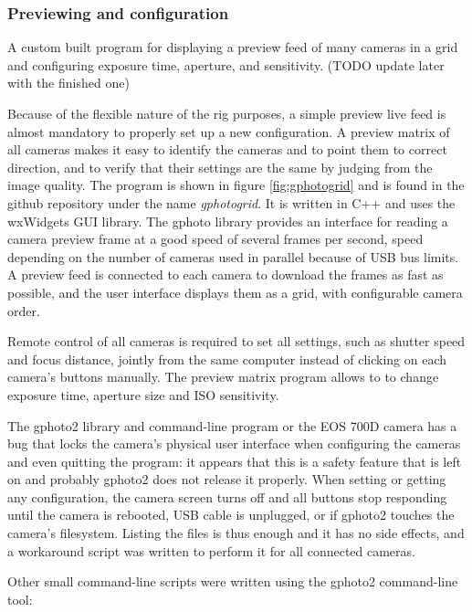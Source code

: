 
\subsubsection{Previewing and configuration} %

{A custom built program for displaying a preview feed of many cameras in a grid and configuring exposure time, aperture, and sensitivity. (TODO update later with the finished one)}

Because of the flexible nature of the rig purposes, a simple preview live feed is almost mandatory to properly set up a new configuration.
A preview matrix of all cameras makes it easy to identify the cameras and to point them to correct direction, and to verify that their settings are the same by judging from the image quality.
The program is shown in figure \ref{fig:gphotogrid} and is found in the github repository under the name \emph{gphotogrid}.
It is written in C++ and uses the wxWidgets GUI library.
The gphoto library provides an interface for reading a camera preview frame at a good speed of several frames per second, speed depending on the number of cameras used in parallel because of USB bus limits.
A preview feed is connected to each camera to download the frames as fast as possible, and the user interface displays them as a grid, with configurable camera order.

Remote control of all cameras is required to set all settings, such as shutter speed and focus distance, jointly from the same computer instead of clicking on each camera's buttons manually.
The preview matrix program allows to to change exposure time, aperture size and ISO sensitivity.

The gphoto2 library and command-line program or the EOS 700D camera has a bug that locks the camera's physical user interface when configuring the cameras and even quitting the program:
it appears that this is a safety feature that is left on and probably gphoto2 does not release it properly.
When setting or getting any configuration, the camera screen turns off and all buttons stop responding until the camera is rebooted, USB cable is unplugged, or if gphoto2 touches the camera's filesystem.
Listing the files is thus enough and it has no side effects, and a workaround script was written to perform it for all connected cameras.

Other small command-line scripts were written using the gphoto2 command-line tool:

